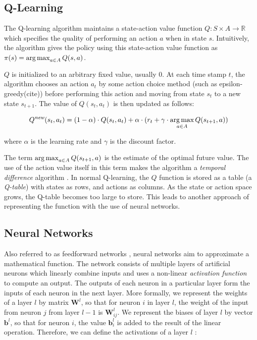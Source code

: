 \subsection{Q-Learning}
The Q-learning algorithm maintains a state-action value function $Q : S \times A \to \mathbb{R}$ which specifies the quality of performing an action $a$ when in state $s$. Intuitively, the algorithm gives the policy using this state-action value function as $\pi(s) = \operatorname*{arg\,max}_{a \in A}Q(s,a)$.

$Q$ is initialized to an arbitrary fixed value, usually $0$. At each time stamp $t$, the algorithm chooses an action $a_t$ by some action choice method (such as epsilon-greedy(cite)) before performing this action and moving from state $s_t$ to a new state $s_{t+1}$. The value of $Q(s_t,a_t)$ is then updated as follows:

\[Q^{\textit{new}}(s_t,a_t) = (1-\alpha) \cdot Q(s_t,a_t) + \alpha \cdot (r_t + \gamma \cdot \operatorname*{arg\,max}_{a \in A}Q(s_{t+1},a))\]

where $\alpha$ is the learning rate and $\gamma$ is the discount factor.

The term $\operatorname*{arg\,max}_{a \in A}Q(s_{t+1},a)$ is the estimate of the optimal future value. The use of the action value itself in this term makes the algorithm a \textit{temporal difference} algorithm \cite{RLAnIntro}.
In normal Q-learning, the $Q$ function is stored as a table (a \textit{Q-table}) with states as rows, and actions as columns. As the state or action space grows, the Q-table becomes too large to store. This leads to another approach of representing the function with the use of neural networks.


\subsection{Neural Networks}

Also referred to as feedforward networks \cite{deeplearning}, neural networks aim to approximate a mathematical function. The network consists of multiple layers of artificial neurons which linearly combine inputs and uses a non-linear \textit{activation function} to compute an output. The outputs of each neuron in a particular layer form the inputs of each neuron in the next layer. More formally, we represent the weights of a layer $l$ by matrix $\boldsymbol{W}^l$, so that for neuron $i$ in layer $l$, the weight of the input from neuron $j$ from layer $l-1$ is $\boldsymbol{W}^l_{ij}$. We represent the biases of layer $l$ by vector $\boldsymbol{b}^l$, so that for neuron $i$, the value $\boldsymbol{b}^l_i$ is added to the result of the linear operation. Therefore, we can define the activations of a layer $l$ \cite{csmlnotes}:

